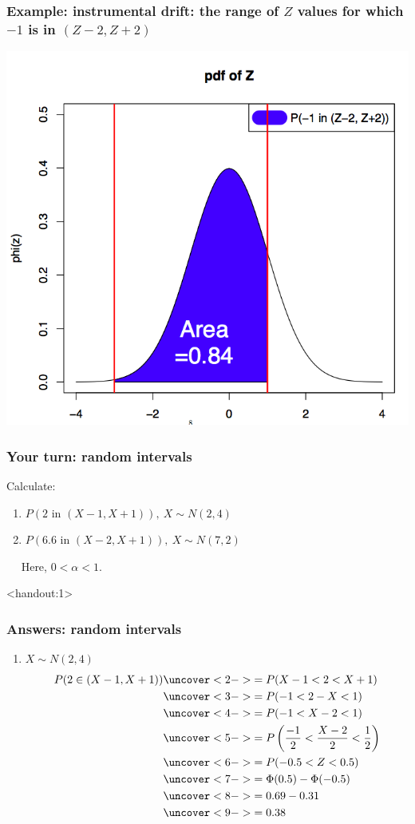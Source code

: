 \documentclass[handout]{beamer}\usepackage[]{graphicx}\usepackage[]{color}
\newcommand{\answers}{1}
\providecommand{\q}{$\quad$ \newline}
\numberwithin{equation}{section}
\begin{document}
\begin{frame}
\frametitle{Example: instrumental drift: the range of $Z$ values for which $-1$ is in $(Z - 2, Z + 2)$}
\begin{center}
 \includegraphics{../../fig/rintv1pict.png}
\end{center}
\end{frame}

\begin{frame}
\frametitle{Your turn: random intervals}
Calculate: \q
\begin{enumerate}[1. ]
\item $P(2 \text{ in } (X - 1, X + 1)), \ X \sim N(2, 4)$
\item $P(6.6 \text{ in } (X - 2, X + 1)), \ X \sim N(7, 2)$
\end{enumerate} \q
Here, $0 < \alpha < 1$.
\end{frame}

\begin{frame}<handout:\answers>
\frametitle{Answers: random intervals}
\begin{enumerate}[1. ]
\item $X \sim N(2, 4)$
\begin{align*}
P(2 \in (X - 1, X + 1)) & \uncover<2->{ = P(X - 1 < 2 < X + 1)} \\
&\uncover<3->{= P(-1 < 2 - X < 1)} \\
&\uncover<4->{= P(-1 < X - 2 < 1)} \\
&\uncover<5->{=P \left ( \frac{-1}{2} < \frac{X - 2}{2} < \frac{1}{2} \right )} \\
&\uncover<6->{= P( -0.5 < Z < 0.5)} \\
&\uncover<7->{= \Phi(0.5) - \Phi(-0.5)} \\
&\uncover<8->{= 0.69 - 0.31} \\
&\uncover<9->{= 0.38}
\end{align*}
\end{enumerate}
\end{frame}
\end{document}
